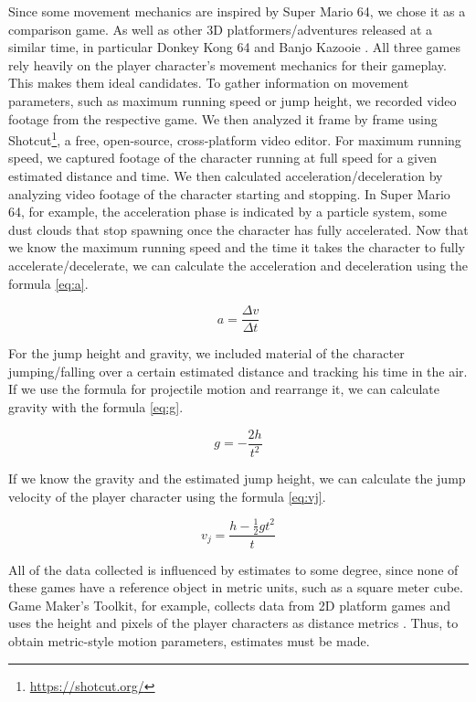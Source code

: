 \documentclass[conference]{IEEEtran}
\begin{document}
Since some movement mechanics are inspired by Super Mario 64, we chose it as a comparison game.
As well as other 3D platformers/adventures released at a similar time,
in particular Donkey Kong 64 \cite{DonkeyKong64} and Banjo Kazooie \cite{BanjoKazooie}.
All three games rely heavily on the player character's movement mechanics for their gameplay.
This makes them ideal candidates.
To gather information on movement parameters, such as maximum running speed or jump height, we recorded video footage from the respective game.
We then analyzed it frame by frame using Shotcut\footnote{\url{https://shotcut.org/}}, a free, open-source, cross-platform video editor. 
For maximum running speed, we captured footage of the character running at full speed for a given estimated distance and time.
We then calculated acceleration/deceleration by analyzing video footage of the character starting and stopping.
In Super Mario 64, for example, the acceleration phase is indicated by a particle system, some dust clouds that stop spawning once the character has fully accelerated.
Now that we know the maximum running speed and the time it takes the character to fully accelerate/decelerate, we can calculate the acceleration and deceleration using the formula \ref{eq:a}.

\begin{equation}
    a = \frac{\Delta v}{\Delta t}
    \label{eq:a}
\end{equation}

For the jump height and gravity, we included material of the character jumping/falling over a certain estimated distance and tracking his time in the air.
If we use the formula for projectile motion \cite{gdc} and rearrange it, we can calculate gravity with the formula \ref{eq:g}.

\begin{equation}
    g = -\frac{2h}{t^2}
    \label{eq:g}
\end{equation}

If we know the gravity and the estimated jump height, we can calculate the jump velocity of the player character using the formula \ref{eq:vj}.

\begin{equation}
    v_j = \frac{h - \frac{1}{2}gt^2}{t}
    \label{eq:vj}
\end{equation}

All of the data collected is influenced by estimates to some degree, since none of these games have a reference object in metric units, such as a square meter cube.
Game Maker's Toolkit, for example, collects data from 2D platform games and uses the height and pixels of the player characters as distance metrics \cite{gameMakerTool}.
Thus, to obtain metric-style motion parameters, estimates must be made.
\end{document}
